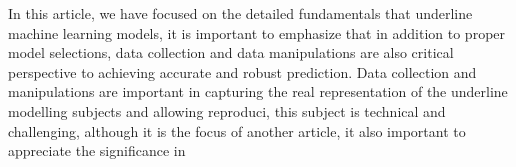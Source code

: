 
\par
In this article, we have focused on the detailed fundamentals that underline machine learning models, it is important to emphasize that in addition to proper model selections, data collection and data manipulations are also critical perspective to achieving accurate and robust prediction. Data collection and manipulations are important in capturing the real representation of the underline modelling subjects and allowing reproduci, this subject is technical and challenging, although it is the focus of another article, it also important to appreciate the significance in 
\par 

